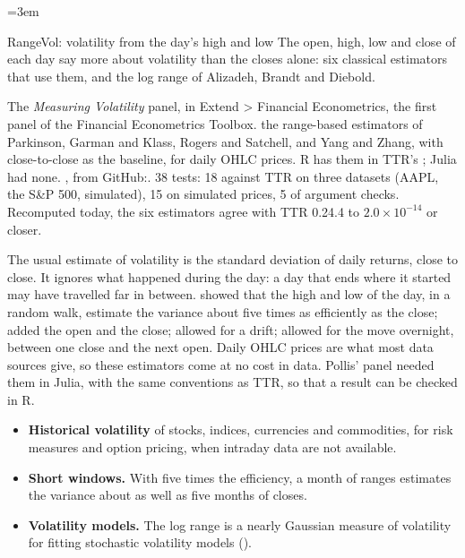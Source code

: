 \emergencystretch=3em

  {RangeVol: volatility from the day's high and low}
  {The open, high, low and close of each day say more about volatility than the closes alone: six classical
   estimators that use them, and the log range of Alizadeh, Brandt and Diebold.}

\factsheet
  {The \emph{Measuring Volatility} panel, in Extend > Financial Econometrics, the first panel of the Financial
   Econometrics Toolbox.}
  {the range-based estimators of Parkinson, Garman and Klass, Rogers and Satchell, and Yang and Zhang, with
   close-to-close as the baseline, for daily OHLC prices. R has them in TTR's ; Julia had none.}
  {, from GitHub:\newline {}.}
  {38 tests: 18 against TTR on three datasets (AAPL, the S\&P 500, simulated), 15 on simulated prices, 5 of argument checks. Recomputed today, the six
   estimators agree with TTR 0.24.4 to $2.0\times10^{-14}$ or closer.}

The usual estimate of volatility is the standard deviation of daily returns, close to close. It ignores what happened
during the day: a day that ends where it started may have travelled far in between.  showed that the high and low of the day, in a random walk, estimate the variance about five times as
efficiently as the close;  added the open and the close;
 allowed for a drift;  allowed for
the move overnight, between one close and the next open. Daily OHLC prices are what most data sources give, so these
estimators come at no cost in data. Pollis' panel needed them in Julia, with the same conventions as TTR, so that a
result can be checked in R.

\begin{itemize}
  \item \textbf{Historical volatility} of stocks, indices, currencies and commodities, for risk measures and option
    pricing, when intraday data are not available.
  \item \textbf{Short windows.} With five times the efficiency, a month of ranges estimates the variance about as
    well as five months of closes.
  \item \textbf{Volatility models.} The log range is a nearly Gaussian measure of volatility for fitting stochastic
    volatility models ().
\end{itemize}

